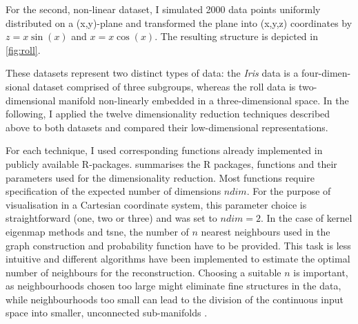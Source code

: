 For the second, non-linear dataset, I simulated \num{2000} data points uniformly distributed on a (x,y)-plane and transformed the plane into (x,y,z) coordinates by \(z = x \sin(x)\) and \(x = x \cos(x)\). The resulting  structure is depicted in \cref{fig:roll}. 

These datasets represent two distinct types of data: the \textit{Iris} data is a four-dimen- sional dataset comprised of three subgroups, whereas the roll data is two-dimensional manifold non-linearly embedded in a three-dimensional space. In the following, I applied the twelve dimensionality reduction techniques described above to both datasets and compared their low-dimensional representations. 

For each technique, I used corresponding functions already implemented in publicly available R-packages.  summarises the R packages, functions and their parameters used for the dimensionality reduction. Most functions require specification of the expected number of dimensions \(ndim\). For the purpose of visualisation in a Cartesian coordinate system, this parameter choice is straightforward (one, two or three) and was set to  \(ndim=2\). In the case of kernel eigenmap methods and \gls{tsne}, the number of \(n\) nearest neighbours used in the graph construction and probability function have to be provided. This task is less intuitive and different algorithms have been implemented to estimate the optimal number of neighbours for the reconstruction. Choosing a suitable \(n\) is important, as neighbourhoods chosen too large might eliminate fine structures in the data, while neighbourhoods too small can lead to the division of the continuous input space into smaller, unconnected sub-manifolds \citep{Kayo2006}.

